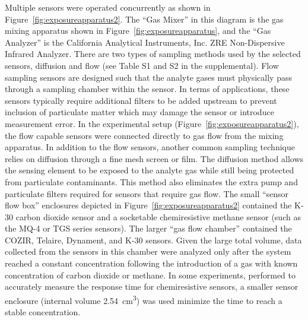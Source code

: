 \documentclass[times]{joehreview}
\begin{document}
	Multiple sensors were operated concurrently as shown in Figure~\ref{fig:exposureapparatus2}.   The ``Gas Mixer'' in this diagram is the gas mixing apparatus shown in Figure~\ref{fig:exposureapparatus}, and the ``Gas Analyzer'' is the California Analytical Instruments, Inc. ZRE Non-Dispersive Infrared Analyzer.  There are two types of sampling methods used by the selected sensors, diffusion and flow (see Table S1 and S2 in the supplemental).  Flow sampling sensors are designed such that the analyte gases must physically pass through a sampling chamber within the sensor.  In terms of applications, these sensors typically require additional filters to be added upstream to prevent inclusion of particulate matter which may damage the sensor or introduce measurement error.  In the experimental setup (Figure~\ref{fig:exposureapparatus2}), the flow capable sensors were connected directly to gas flow from the mixing apparatus.  In addition to the flow sensors, another common sampling technique relies on diffusion through a fine mesh screen or film.  The diffusion method allows the sensing element to be exposed to the analyte gas while still being protected from particulate contaminants.  This method also eliminates the extra pump and particulate filters required for sensors that require gas flow.  The small ``sensor flow box'' enclosures depicted in Figure~\ref{fig:exposureapparatus2} contained the K-30 carbon dioxide sensor and a socketable chemiresistive methane sensor (such as the MQ-4 or TGS series sensors).  The larger ``gas flow chamber'' contained the COZIR, Telaire, Dynament, and K-30 sensors.  Given the large total volume, data collected from the sensors in this chamber were analyzed only after the system reached a constant concentration following the introduction of a gas with known concentration of carbon dioxide or methane.  In some experiments, performed to accurately measure the response time for chemiresistive sensors, a smaller sensor enclosure (internal volume \SI{2.54}{\centi\meter\cubed}) was used minimize the time to reach a stable concentration.
	
\end{document}
